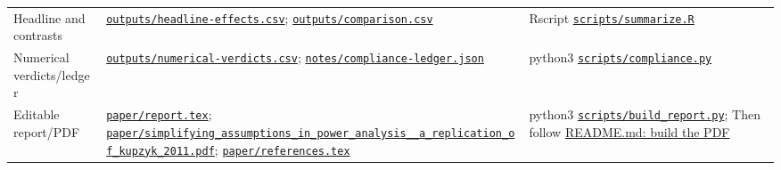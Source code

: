\documentclass[11pt]{article}
\begin{document}
\begin{longtable}{>{\raggedright\arraybackslash}p{.22\linewidth}>{\raggedright\arraybackslash}p{.35\linewidth}>{\raggedright\arraybackslash}p{.35\linewidth}}
Headline and contrasts&\href{https://github.com/alectionary/vibe-math/blob/master/formalization/kupzyk-power-assumptions/outputs/headline-effects.csv}{\nolinkurl{outputs/headline-effects.csv}}; \href{https://github.com/alectionary/vibe-math/blob/master/formalization/kupzyk-power-assumptions/outputs/comparison.csv}{\nolinkurl{outputs/comparison.csv}}&Rscript \href{https://github.com/alectionary/vibe-math/blob/master/formalization/kupzyk-power-assumptions/scripts/summarize.R}{\nolinkurl{scripts/summarize.R}}\\
Numerical verdicts/ledger&\href{https://github.com/alectionary/vibe-math/blob/master/formalization/kupzyk-power-assumptions/outputs/numerical-verdicts.csv}{\nolinkurl{outputs/numerical-verdicts.csv}}; \href{https://github.com/alectionary/vibe-math/blob/master/formalization/kupzyk-power-assumptions/notes/compliance-ledger.json}{\nolinkurl{notes/compliance-ledger.json}}&python3 \href{https://github.com/alectionary/vibe-math/blob/master/formalization/kupzyk-power-assumptions/scripts/compliance.py}{\nolinkurl{scripts/compliance.py}}\\
Editable report/PDF&\href{https://github.com/alectionary/vibe-math/blob/master/formalization/kupzyk-power-assumptions/paper/report.tex}{\nolinkurl{paper/report.tex}}; \href{https://github.com/alectionary/vibe-math/blob/master/formalization/kupzyk-power-assumptions/paper/simplifying_assumptions_in_power_analysis__a_replication_of_kupzyk_2011.pdf}{\nolinkurl{paper/simplifying_assumptions_in_power_analysis__a_replication_of_kupzyk_2011.pdf}}; \href{https://github.com/alectionary/vibe-math/blob/master/formalization/kupzyk-power-assumptions/paper/references.tex}{\nolinkurl{paper/references.tex}}&python3 \href{https://github.com/alectionary/vibe-math/blob/master/formalization/kupzyk-power-assumptions/scripts/build_report.py}{\nolinkurl{scripts/build_report.py}}; Then follow \href{https://github.com/alectionary/vibe-math/blob/master/formalization/kupzyk-power-assumptions/README.md#build-the-pdf-from-saved-results}{README.md: build the PDF}\\
\bottomrule\end{longtable}\normalsize
\end{document}
